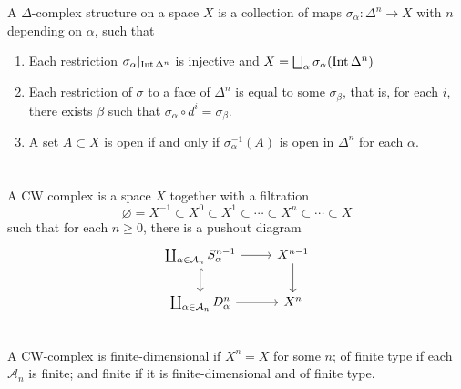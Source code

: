 \documentclass[12pt, oneside]{book}
\begin{document}
\begin{definition}
    A $\Delta$-complex structure on a space $X$ is a collection of maps $\sigma_\alpha:\Delta^{n}\to X$ with $n$ depending on $\alpha$, such that
    \begin{enumerate}[label=(\roman*)]
        \item
              Each restriction $\sigma_\alpha|_{\operatorname{\operatorname{Int}} \Delta^{n}}$ is injective and $X= \bigsqcup_{\alpha} \sigma_\alpha(\operatorname{\operatorname{Int}} \Delta^{n})$
        \item
              Each restriction of $\sigma$ to a face of $\Delta^{n}$ is equal to some $\sigma_\beta$, that is, for each $i$, there exists $\beta$ such that $\sigma_\alpha \circ d^i = \sigma_\beta$.
        \item
              A set $A \subset X$ is open if and only if $\sigma_\alpha^{-1}(A)$ is open in $\Delta^{n}$ for each $\alpha$.
    \end{enumerate}
\end{definition}



\section{}
\begin{definition}
    A CW complex is a space $X$ together with a filtration
    \begin{equation*}
        \varnothing = X^{-1} \subset X^0 \subset X^1 \subset \cdots \subset X^n \subset \cdots \subset X
    \end{equation*}
    such that for each $n\geq 0$, there is a pushout diagram
    \begin{equation*}
        \begin{tikzcd}
            \coprod_{\alpha \in \mathcal{A}_n} S^{n-1}_\alpha \arrow[r] \arrow[d,hook] & X^{n-1} \arrow[d]\\
            \coprod_{\alpha \in \mathcal{A}_n} D^{n}_\alpha \arrow[r,""] & X^n \\
        \end{tikzcd}
    \end{equation*}
    A CW-complex is finite-dimensional if $X^n = X$ for some $n$; of finite type if each $\mathcal{A}_n$ is finite; and finite if it is finite-dimensional and of finite type.
\end{definition}
\end{document}
